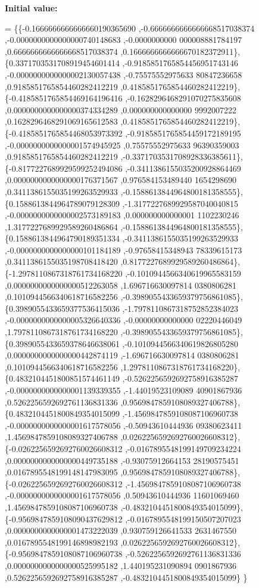 {\bfseries Initial value\+:}
\begin{DoxyCode}
= \{\{-0.1666666666666660190365690 ,-0.6666666666666668517038374 ,-0.0000000000000000740148683 ,-0.0000000000
      000008881784197 ,0.6666666666666668517038374 ,0.1666666666666670182372911\},
\{0.3371703531708919454601414 ,-0.9185851765854456951743146 ,-0.0000000000000002130057438 ,-0.75575552975633
      80847236658 ,0.9185851765854460282412219 ,0.4185851765854460282412219\},
\{-0.4185851765854469164196416 ,-0.1628296468291070275835608 ,0.0000000000000000374334289 ,0.000000000000000
      9992007222 ,0.1628296468291069165612583 ,0.4185851765854460282412219\},
\{-0.4185851765854468053973392 ,-0.9185851765854459172189195 ,-0.0000000000000001574945925 ,0.75575552975633
      96390359003 ,0.9185851765854460282412219 ,-0.3371703531708928336385611\},
\{-0.8177227689929599252494086 ,-0.3411386155035200928864469 ,0.0000000000000000176371567 ,0.976584153489440
      1654298690 ,0.3411386155035199263529933 ,-0.1588613844964800181358555\},
\{0.1588613844964789079128309 ,-1.3177227689929587040040815 ,-0.0000000000000002573189183 ,0.000000000000001
      1102230246 ,1.3177227689929589260486864 ,-0.1588613844964800181358555\},
\{0.1588613844964790189351334 ,-0.3411386155035199263529933 ,-0.0000000000000000101184189 ,-0.97658415348943
      78339615173 ,0.3411386155035198708418420 ,0.8177227689929589260486864\},
\{-1.2978110867318761734168220 ,-0.1010944566340619965583159 ,0.0000000000000000512263058 ,1.696716630097814
      0380806281 ,0.1010944566340618716582256 ,-0.3989055433659379756861085\},
\{0.3989055433659377536415036 ,-1.7978110867318752852384023 ,-0.0000000000000005326640336 ,-0.00000000000000
      02220446049 ,1.7978110867318761734168220 ,-0.3989055433659379756861085\},
\{0.3989055433659378646638061 ,-0.1010944566340619826805280 ,0.0000000000000000442874119 ,-1.696716630097814
      0380806281 ,0.1010944566340618716582256 ,1.2978110867318761734168220\},
\{0.4832104451800851574461149 ,-0.5262256592692758916385287 ,-0.0000000000000001139339355 ,-1.44019523109089
      40901867936 ,0.5262256592692761136831336 ,0.9569847859108089327406788\},
\{0.4832104451800849354015099 ,-1.4569847859108087106960738 ,-0.0000000000000001617578056 ,-0.50943610444936
      09380623411 ,1.4569847859108089327406788 ,0.0262256592692760026608312\},
\{-0.0262256592692760026608312 ,-0.0167895548199149709234224 ,0.0000000000000000449735188 ,-0.93075912664153
      28190575451 ,0.0167895548199148147983095 ,0.9569847859108089327406788\},
\{-0.0262256592692760026608312 ,-1.4569847859108087106960738 ,-0.0000000000000001617578056 ,0.50943610444936
      11601069460 ,1.4569847859108087106960738 ,-0.4832104451800849354015099\},
\{-0.9569847859108090437629812 ,-0.0167895548199150507207023 ,0.0000000000000001473222039 ,0.930759126641533
      2631467550 ,0.0167895548199146898982193 ,0.0262256592692760026608312\},
\{-0.9569847859108087106960738 ,-0.5262256592692761136831336 ,0.0000000000000000525995182 ,1.440195231090894
      0901867936 ,0.5262256592692758916385287 ,-0.4832104451800849354015099\}
\}
\end{DoxyCode}
